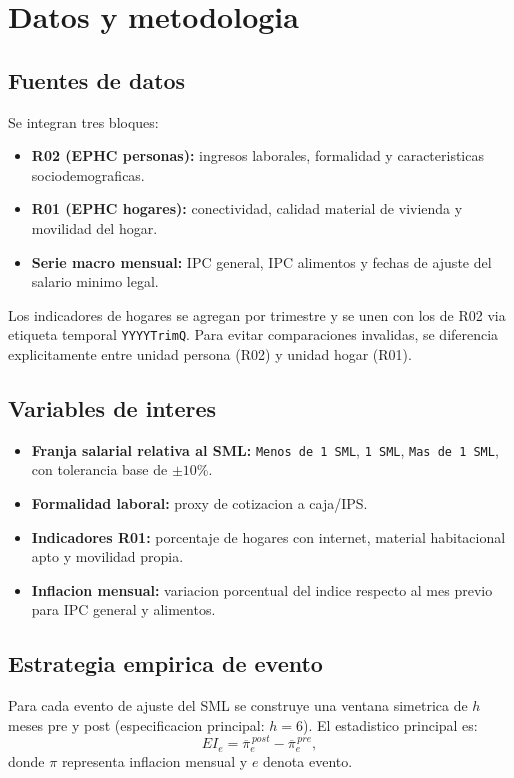 \section{Datos y metodologia}

\subsection{Fuentes de datos}

Se integran tres bloques:
\begin{itemize}
  \item \textbf{R02 (EPHC personas):} ingresos laborales, formalidad y caracteristicas sociodemograficas.
  \item \textbf{R01 (EPHC hogares):} conectividad, calidad material de vivienda y movilidad del hogar.
  \item \textbf{Serie macro mensual:} IPC general, IPC alimentos y fechas de ajuste del salario minimo legal.
\end{itemize}

Los indicadores de hogares se agregan por trimestre y se unen con los de R02 via etiqueta temporal \texttt{YYYYTrimQ}. Para evitar comparaciones invalidas, se diferencia explicitamente entre unidad persona (R02) y unidad hogar (R01).

\subsection{Variables de interes}

\begin{itemize}
  \item \textbf{Franja salarial relativa al SML:} \texttt{Menos de 1 SML}, \texttt{1 SML}, \texttt{Mas de 1 SML}, con tolerancia base de $\pm 10\%$.
  \item \textbf{Formalidad laboral:} proxy de cotizacion a caja/IPS.
  \item \textbf{Indicadores R01:} porcentaje de hogares con internet, material habitacional apto y movilidad propia.
  \item \textbf{Inflacion mensual:} variacion porcentual del indice respecto al mes previo para IPC general y alimentos.
\end{itemize}

\subsection{Estrategia empirica de evento}

Para cada evento de ajuste del SML se construye una ventana simetrica de $h$ meses pre y post (especificacion principal: $h=6$). El estadistico principal es:
\begin{equation}
EI_e = \overline{\pi}^{\,post}_e - \overline{\pi}^{\,pre}_e,
\end{equation}
donde $\pi$ representa inflacion mensual y $e$ denota evento.

